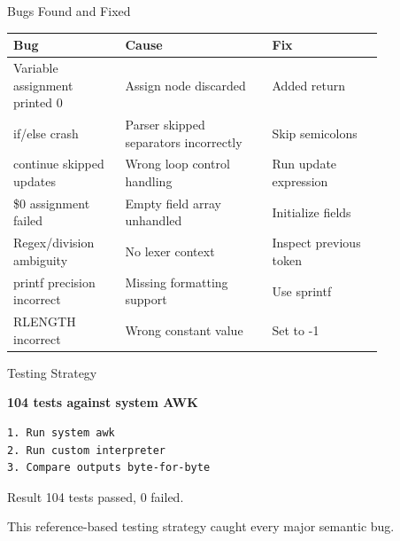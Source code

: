 \documentclass[aspectratio=169]{beamer}
\begin{document}
\begin{frame}{Bugs Found and Fixed}

\small

\begin{tabular}{p{0.25\linewidth} p{0.33\linewidth} p{0.25\linewidth}}
\toprule
\textbf{Bug} & \textbf{Cause} & \textbf{Fix} \\
\midrule
Variable assignment printed 0 & Assign node discarded & Added return \\
if/else crash & Parser skipped separators incorrectly & Skip semicolons \\
continue skipped updates & Wrong loop control handling & Run update expression \\
\$0 assignment failed & Empty field array unhandled & Initialize fields \\
Regex/division ambiguity & No lexer context & Inspect previous token \\
printf precision incorrect & Missing formatting support & Use sprintf \\
RLENGTH incorrect & Wrong constant value & Set to -1 \\
\bottomrule
\end{tabular}

\end{frame}

\begin{frame}[fragile]{Testing Strategy}

\textbf{104 tests against system AWK}

\vspace{1em}

\begin{lstlisting}[language=bash]
1. Run system awk
2. Run custom interpreter
3. Compare outputs byte-for-byte
\end{lstlisting}

\vspace{1em}

\begin{block}{Result}
104 tests passed, 0 failed.
\end{block}

\vspace{0.5em}

This reference-based testing strategy caught every major semantic bug.

\end{frame}
\end{document}
